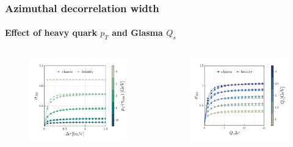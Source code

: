 \documentclass[aspectratio=169,11pt,usenames,dvipsnames]{beamer}
\begin{document}
\begin{frame}
    \frametitle{Azimuthal decorrelation width}
    \framesubtitle{Effect of heavy quark $p_T$ and Glasma $Q_s$}
    \begin{center}
        \begin{columns}[onlytextwidth,t]
           \begin{figure}
                \centering
                \vspace{5pt}
                \includegraphics[width=\columnwidth]{images/sigma_dphideta_tau_charm_beauty_pT_dep_final_azimuth.png}
            \end{figure}
            \vspace{-17pt}
            \begin{figure}
                \centering
                \includegraphics[width=1.02\columnwidth]{images/sigma_dphideta_tau_charm_beauty_Qs_dep_scaled_final_azimuth.png}

\end{figure}
\end{columns}
\end{center}
\end{frame}
\end{document}

